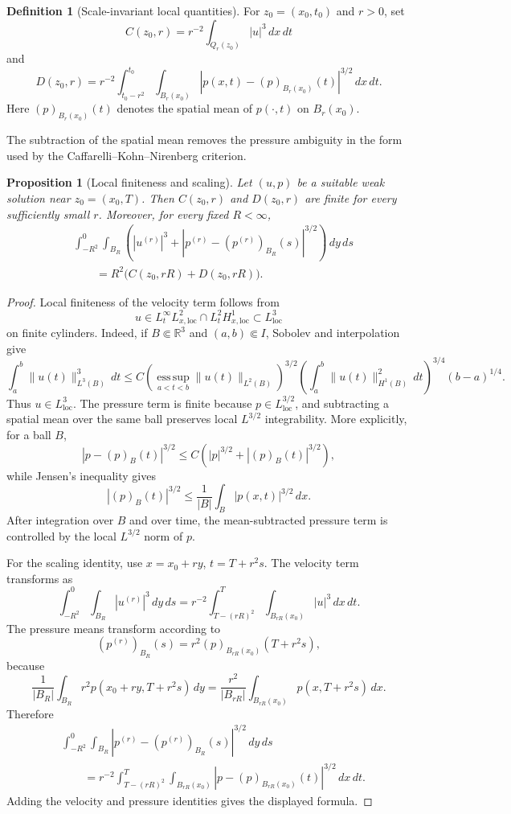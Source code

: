 \documentclass[11pt]{amsart}
\theoremstyle{plain}
\newtheorem{proposition}[proposition]{Proposition}
\theoremstyle{definition}
\newtheorem{definition}[definition]{Definition}
\theoremstyle{remark}
\begin{document}
\begin{definition}[Scale-invariant local quantities]
For \(z_0=(x_0,t_0)\) and \(r>0\), set
\[
  C(z_0,r)=r^{-2}\int_{Q_r(z_0)} |u|^3\,dx\,dt
\]
and
\[
  D(z_0,r)=r^{-2}
  \int_{t_0-r^2}^{t_0}\int_{B_r(x_0)}
  |p(x,t)-(p)_{B_r(x_0)}(t)|^{3/2}\,dx\,dt.
\]
Here \((p)_{B_r(x_0)}(t)\) denotes the spatial mean of \(p(\cdot,t)\) on
\(B_r(x_0)\).
\end{definition}

The subtraction of the spatial mean removes the pressure ambiguity in the form
used by the Caffarelli--Kohn--Nirenberg criterion.

\begin{proposition}[Local finiteness and scaling]\label{prop:critical-scaling}
Let \((u,p)\) be a suitable weak solution near \(z_0=(x_0,T)\).  Then
\(C(z_0,r)\) and \(D(z_0,r)\) are finite for every sufficiently small \(r\).
Moreover, for every fixed \(R<\infty\),
\[
\begin{aligned}
&\int_{-R^2}^{0}\int_{B_R}
\left(
|u^{(r)}|^3+
|p^{(r)}-(p^{(r)})_{B_R}(s)|^{3/2}
\right)\,dy\,ds \\
&\qquad
=R^2\bigl(C(z_0,rR)+D(z_0,rR)\bigr).
\end{aligned}
\]
\end{proposition}

\begin{proof}
Local finiteness of the velocity term follows from
\[
  u\in L^\infty_tL^2_{x,\mathrm{loc}}
  \cap L^2_tH^1_{x,\mathrm{loc}}
  \subset L^3_{\mathrm{loc}}
\]
on finite cylinders.  Indeed, if \(B\Subset\mathbb R^3\) and
\((a,b)\Subset I\), Sobolev and interpolation give
\[
  \int_a^b \|u(t)\|_{L^3(B)}^3\,dt
  \le
  C
  \left(\operatorname*{ess\,sup}_{a<t<b}\|u(t)\|_{L^2(B)}\right)^{3/2}
  \left(\int_a^b \|u(t)\|_{H^1(B)}^2\,dt\right)^{3/4}
  (b-a)^{1/4}.
\]
Thus \(u\in L^3_{\mathrm{loc}}\).  The pressure term is finite because
\(p\in L^{3/2}_{\mathrm{loc}}\), and subtracting a spatial mean over the same
ball preserves local \(L^{3/2}\) integrability.  More explicitly, for a ball
\(B\),
\[
  |p-(p)_B(t)|^{3/2}\le C\left(|p|^{3/2}+|(p)_B(t)|^{3/2}\right),
\]
while Jensen's inequality gives
\[
  |(p)_B(t)|^{3/2}
  \le \frac1{|B|}\int_B |p(x,t)|^{3/2}\,dx.
\]
After integration over \(B\) and over time, the mean-subtracted pressure term is
controlled by the local \(L^{3/2}\) norm of \(p\).

For the scaling identity, use \(x=x_0+ry\), \(t=T+r^2s\).  The velocity term
transforms as
\[
  \int_{-R^2}^{0}\int_{B_R}|u^{(r)}|^3\,dy\,ds
  =r^{-2}\int_{T-(rR)^2}^{T}\int_{B_{rR}(x_0)}|u|^3\,dx\,dt.
\]
The pressure means transform according to
\[
  (p^{(r)})_{B_R}(s)=r^2(p)_{B_{rR}(x_0)}(T+r^2s),
\]
because
\[
  \frac1{|B_R|}\int_{B_R} r^2p(x_0+ry,T+r^2s)\,dy
  =
  \frac{r^2}{|B_{rR}|}\int_{B_{rR}(x_0)}p(x,T+r^2s)\,dx .
\]
Therefore
\[
\begin{aligned}
&\int_{-R^2}^{0}\int_{B_R}
|p^{(r)}-(p^{(r)})_{B_R}(s)|^{3/2}\,dy\,ds \\
&\qquad =
r^{-2}\int_{T-(rR)^2}^{T}\int_{B_{rR}(x_0)}
|p-(p)_{B_{rR}(x_0)}(t)|^{3/2}\,dx\,dt .
\end{aligned}
\]
Adding the velocity and pressure identities gives the displayed formula.
\end{proof}
\end{document}
